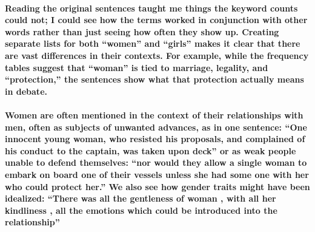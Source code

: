 \documentclass[
]{article}
\begin{document}
\paragraph{Reading the original sentences taught me things the keyword
counts could not; I could see how the terms worked in conjunction with
other words rather than just seeing how often they show up. Creating
separate lists for both ``women'' and ``girls'' makes it clear that
there are vast differences in their contexts. For example, while the
frequency tables suggest that ``woman'' is tied to marriage, legality,
and ``protection,'' the sentences show what that protection actually
means in
debate.}\label{reading-the-original-sentences-taught-me-things-the-keyword-counts-could-not-i-could-see-how-the-terms-worked-in-conjunction-with-other-words-rather-than-just-seeing-how-often-they-show-up.-creating-separate-lists-for-both-women-and-girls-makes-it-clear-that-there-are-vast-differences-in-their-contexts.-for-example-while-the-frequency-tables-suggest-that-woman-is-tied-to-marriage-legality-and-protection-the-sentences-show-what-that-protection-actually-means-in-debate.}

\paragraph{Women are often mentioned in the context of their
relationships with men, often as subjects of unwanted advances, as in
one sentence: ``One innocent young woman, who resisted his proposals,
and complained of his conduct to the captain, was taken upon deck'' or
as weak people unable to defend themselves: ``nor would they allow a
single woman to embark on board one of their vessels unless she had some
one with her who could protect her.'' We also see how gender traits
might have been idealized: ``There was all the gentleness of woman ,
with all her kindliness , all the emotions which could be introduced
into the
relationship''}\label{women-are-often-mentioned-in-the-context-of-their-relationships-with-men-often-as-subjects-of-unwanted-advances-as-in-one-sentence-one-innocent-young-woman-who-resisted-his-proposals-and-complained-of-his-conduct-to-the-captain-was-taken-upon-deck-or-as-weak-people-unable-to-defend-themselves-nor-would-they-allow-a-single-woman-to-embark-on-board-one-of-their-vessels-unless-she-had-some-one-with-her-who-could-protect-her.-we-also-see-how-gender-traits-might-have-been-idealized-there-was-all-the-gentleness-of-woman-with-all-her-kindliness-all-the-emotions-which-could-be-introduced-into-the-relationship}
\end{document}
